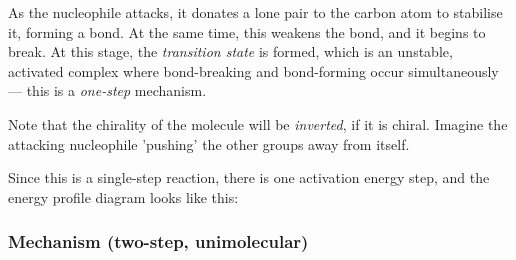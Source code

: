 				As the nucleophile attacks, it donates a lone pair to the carbon atom to stabilise it, forming a bond. At the same time, this
				weakens the  bond, and it begins to break. At this stage, the \textit{transition state} is formed, which is an
				unstable, activated complex where bond-breaking and bond-forming occur simultaneously –– this is a \textit{one-step} mechanism.


				\pagebreak
				Note that the chirality of the molecule will be \textit{inverted}, if it is chiral. Imagine the attacking nucleophile
				'pushing' the other groups away from itself.



				Since this is a single-step reaction, there is one activation energy step, and the energy profile diagram looks like
				this:



			\pagebreak
			\subsubsection{\snone Mechanism (two-step, unimolecular)}

